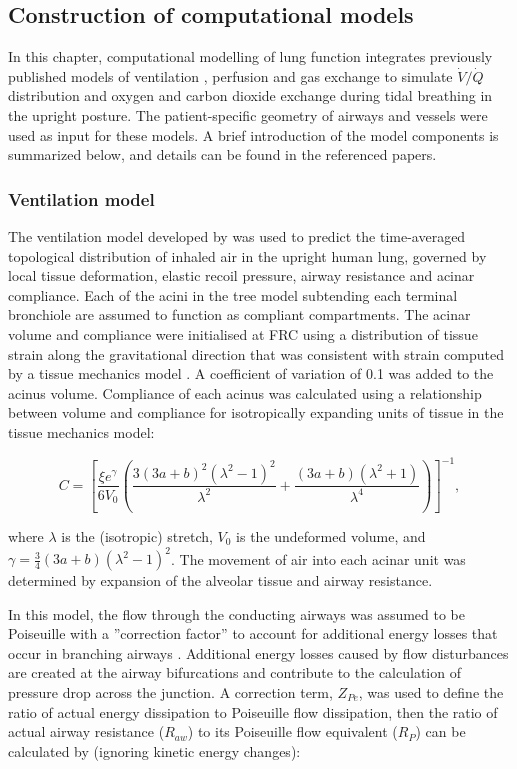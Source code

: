 \subsection{Construction of computational models} \label{ComputationalModelConstruction}
In this chapter, computational modelling of lung function integrates previously published models of ventilation \citep{swan2012computational}, perfusion \citep{clark2010contribution, clark2011interdependent} and gas exchange \citep{clark2014lack} to simulate $\dot{V}/\dot{Q}$ distribution and oxygen and carbon dioxide exchange during tidal breathing in the upright posture. The patient-specific geometry of airways and vessels were used as input for these models. A brief introduction of the model components is summarized below, and details can be found in the referenced papers.

\subsubsection{Ventilation model}
The ventilation model developed by \cite{swan2012computational} was used to predict the time-averaged topological distribution of inhaled air in the upright human lung, governed by local tissue deformation, elastic recoil pressure, airway resistance and acinar compliance. Each of the acini in the tree model subtending each terminal bronchiole are assumed to function as compliant compartments. The acinar volume and compliance were initialised at FRC using a distribution of tissue strain along the gravitational direction that was consistent with strain computed by a tissue mechanics model \citep{tawhai2009supine}. A coefficient of variation of 0.1 was added to the acinus volume. Compliance of each acinus was calculated using a relationship between volume and compliance for isotropically expanding units of tissue in the \cite{tawhai2009supine} tissue mechanics model:

\begin{equation}
 \label{eq:TissueCompliance}
 C = [\frac{\xi e^{\gamma}}{6V_0}(\frac{3(3a+b)^2(\lambda^2-1)^2}{\lambda^2} + \frac{(3a+b)(\lambda^2 + 1)}{\lambda^4})]^{-1},
\end{equation}

\noindent where $\lambda$ is the (isotropic) stretch, $V_0$ is the undeformed volume, and $\gamma = \frac{3}{4}(3a+b)(\lambda^2-1)^2$. The movement of air into each acinar unit was determined by expansion of the alveolar tissue and airway resistance.

In this model, the flow through the conducting airways was assumed to be Poiseuille with a ''correction factor'' to account for additional energy losses that occur in branching airways \citep{pedley1970energy}. Additional energy losses caused by flow disturbances are created at the airway bifurcations and contribute to the calculation of pressure drop across the junction. A correction term, $Z_{Pe}$, was used to define the ratio of actual energy dissipation to Poiseuille flow dissipation, then the ratio of actual airway resistance ($R_{aw}$) to its Poiseuille flow equivalent ($R_P$) can be calculated by (ignoring kinetic energy changes):

